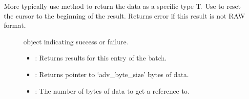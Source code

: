 \documentclass[letterpaper,10pt,english]{sphinxmanual}
\begin{document}
\begin{fulllineitems}
\begin{fulllineitems}
\begin{fulllineitems}
More typically use {\hyperref[\detokenize{cpp_api/classnvidia_1_1inferenceserver_1_1client_1_1InferContext_1_1Result:classnvidia_1_1inferenceserver_1_1client_1_1InferContext_1_1Result_1a2a13887812b025896d569f041db7e2c8}]{}} method to return the data as a specific type T. Use {\hyperref[\detokenize{cpp_api/classnvidia_1_1inferenceserver_1_1client_1_1InferContext_1_1Result:classnvidia_1_1inferenceserver_1_1client_1_1InferContext_1_1Result_1adb27437d415b569a3a4b7700c56002bf}]{}} to reset the cursor to the beginning of the result. Returns error if this result is not RAW format. \begin{description}
\item[{}] \leavevmode
{\hyperref[\detokenize{cpp_api/classnvidia_1_1inferenceserver_1_1client_1_1Error:classnvidia_1_1inferenceserver_1_1client_1_1Error}]{}} object indicating success or failure. 

\item[{}] \leavevmode\begin{itemize}
\item {} 
: Returns results for this entry of the batch. 

\item {} 
: Returns pointer to ‘adv\_byte\_size’ bytes of data. 

\item {} 
: The number of bytes of data to get a reference to. 

\end{itemize}

\end{description}


\end{fulllineitems}



\end{fulllineitems}
\end{fulllineitems}
\end{document}
